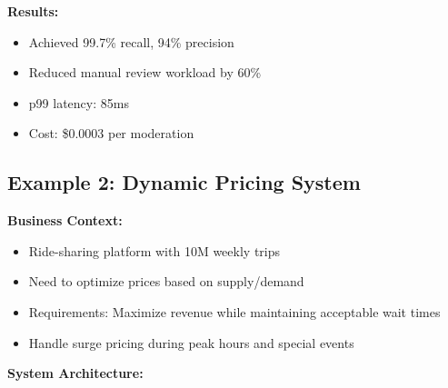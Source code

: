 \textbf{Results:}
\begin{itemize}
    \item Achieved 99.7\% recall, 94\% precision
    \item Reduced manual review workload by 60\%
    \item p99 latency: 85ms
    \item Cost: \$0.0003 per moderation
\end{itemize}

\subsection{Example 2: Dynamic Pricing System}

\textbf{Business Context:}
\begin{itemize}
    \item Ride-sharing platform with 10M weekly trips
    \item Need to optimize prices based on supply/demand
    \item Requirements: Maximize revenue while maintaining acceptable wait times
    \item Handle surge pricing during peak hours and special events
\end{itemize}

\textbf{System Architecture:}

